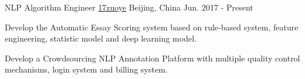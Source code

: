 

\begin{cventries}

  \cventry
    {NLP Algorithm Engineer} %
    {\href{https://www.17zuoye.com/help/aboutus.vpage}{17zuoye}} %
    {Beijing, China} %
    {Jun. 2017 - Present} %
    {
      \begin{cvitems} %
        \item {Develop the Automatic Essay Scoring system based on rule-based system, feature engineering, statistic model and deep learning model.}
        \item {Develop a Crowdsourcing NLP Annotation Platform with multiple quality control mechanisms, login system and billing system.}
      \end{cvitems}
    }



\end{cventries}